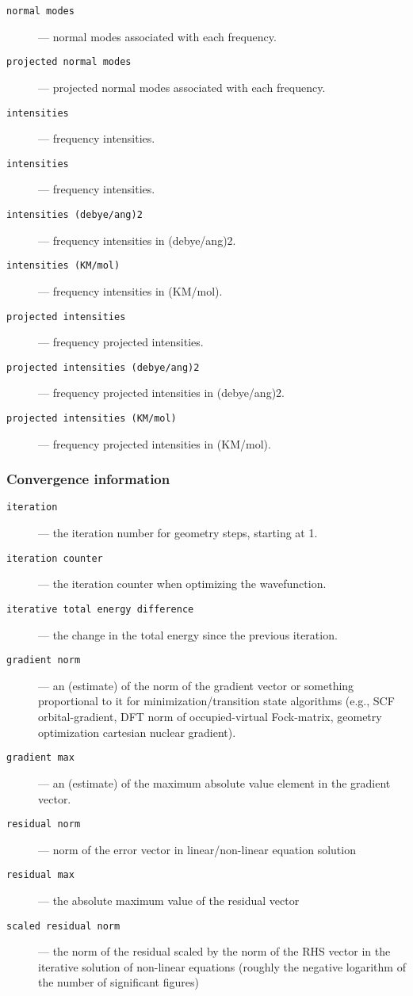 \begin{description}
\item [\texttt{normal modes}] --- normal modes associated with each frequency.
\item [\texttt{projected normal modes}] --- projected normal modes associated 
  with each frequency.
\item [\texttt{intensities}] --- frequency intensities.
\item [\texttt{intensities}] --- frequency intensities.
\item [\texttt{intensities (debye/ang)2}] --- frequency intensities in (debye/ang)2.
\item [\texttt{intensities (KM/mol)}] --- frequency intensities in (KM/mol).
\item [\texttt{projected intensities}] --- frequency projected intensities.
\item [\texttt{projected intensities (debye/ang)2}] --- frequency projected intensities 
  in (debye/ang)2.
\item [\texttt{projected intensities (KM/mol)}] --- frequency projected intensities 
  in (KM/mol).
\end{description}

\subsubsection{Convergence information}

\begin{description}
\item [\texttt{iteration}] --- the iteration number for geometry steps, starting at 1.
\item [\texttt{iteration counter}] --- the iteration counter when optimizing the
  wavefunction.
\item [\texttt{iterative total energy difference}] --- the change in the total 
  energy since the previous iteration.
\item [\texttt{gradient norm}] --- an (estimate) of the norm of the
  gradient vector or something proportional to it for
  minimization/transition state algorithms (e.g., SCF
  orbital-gradient, DFT norm of occupied-virtual Fock-matrix, geometry
  optimization cartesian nuclear gradient).
\item [\texttt{gradient max}] --- an (estimate) of the maximum absolute
  value element in the gradient vector.
\item [\texttt{residual norm}] --- norm of the error vector in
  linear/non-linear equation solution
\item [\texttt{residual max}] --- the absolute maximum value of the
  residual vector
\item [\texttt{scaled residual norm}] --- the norm of the residual
  scaled by the norm of the RHS vector in the iterative solution of
  non-linear equations (roughly the negative logarithm of the number of
  significant figures)
\end{description}

